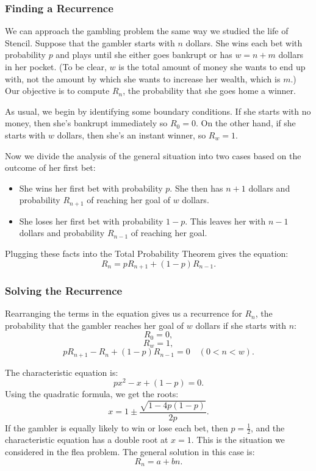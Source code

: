 \documentclass[12pt,a4paper]{article}
\begin{document}
		\subsubsection{Finding a Recurrence}
		
		We can approach the gambling problem the same way we studied the life of Stencil. Suppose that the gambler starts with $n$ dollars. She wins each bet with probability $p$ and plays until she either goes bankrupt or has $w = n + m$ dollars in her pocket. (To be clear, $w$ is the total amount of money she wants to end up with, not the amount by which she wants to increase her wealth, which is $m$.) Our objective is to compute $R_n$, the probability that she goes home a winner.
		
		As usual, we begin by identifying some boundary conditions. If she starts with no money, then she's bankrupt immediately so $R_0 = 0$. On the other hand, if she starts with $w$ dollars, then she's an instant winner, so $R_w = 1$.
		
		Now we divide the analysis of the general situation into two cases based on the outcome of her first bet:
		\begin{itemize}
			\item She wins her first bet with probability $p$. She then has $n + 1$ dollars and probability $R_{n+1}$ of reaching her goal of $w$ dollars.
			\item She loses her first bet with probability $1 - p$. This leaves her with $n - 1$ dollars and probability $R_{n-1}$ of reaching her goal.
		\end{itemize}
		
		Plugging these facts into the Total Probability Theorem gives the equation:
		$$
		R_n = p R_{n+1} + (1 - p) R_{n-1}.
		$$
		
		\subsubsection{Solving the Recurrence}
		
		Rearranging the terms in the equation gives us a recurrence for $R_n$, the probability that the gambler reaches her goal of $w$ dollars if she starts with $n$:
		$$
		R_0 = 0,
		$$
		$$
		R_w = 1,
		$$
		$$
		p R_{n+1} - R_n + (1 - p) R_{n-1} = 0 \quad (0 < n < w).
		$$
		
		The characteristic equation is:
		$$
		p x^2 - x + (1 - p) = 0.
		$$
		Using the quadratic formula, we get the roots:
		$$
		x = 1 \pm \frac{\sqrt{1 - 4p(1 - p)}}{2p}.
		$$
		If the gambler is equally likely to win or lose each bet, then $p = \frac{1}{2}$, and the characteristic equation has a double root at $x = 1$. This is the situation we considered in the flea problem. The general solution in this case is:
		$$
		R_n = a + b n.
		$$
		
\end{document}
